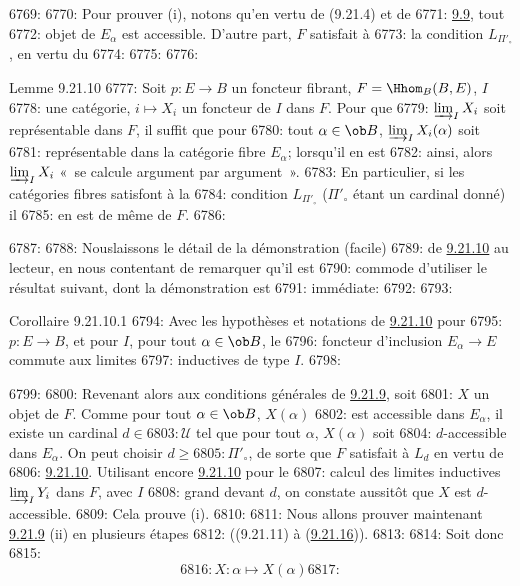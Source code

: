 6769: 
6770: Pour prouver (i), notons qu'en vertu de (9.21.4) et de
6771: \hyperref[I.cor9.9]{9.9}, tout
6772: objet de $E_{\alpha}$ est accessible. D'autre part, $F$ satisfait à
6773: la condition $L_{\Pi'_\circ}$, en vertu du
6774: 
6775: 
6776: \begin{enonce*}{Lemme 9.21.10}
6777: Soit $p:E\rightarrow B$ un foncteur fibrant, $F=\Hhom_B(B,E)$, $I$
6778: une catégorie, $i\mapsto X_i$ un foncteur de $I$ dans $F$. Pour que
6779: $\varinjlim_I X_i$ soit représentable dans $F$, il suffit que pour
6780: tout $\alpha\in \ob B$, $\varinjlim_I X_i(\alpha)$ soit
6781: représentable dans la catégorie fibre $E_{\alpha}$; lorsqu'il en est
6782: ainsi, alors $\varinjlim_I X_i$ « se calcule argument par argument ».
6783: En particulier, si les catégories fibres satisfont à la
6784: condition $L_{\Pi'_\circ}$ ($\Pi'_\circ$ étant un cardinal donné) il
6785: en est de même de $F$.
6786: \end{enonce*}
6787: 
6788: Nous\pageoriginale laissons le détail de la démonstration (facile)
6789: de \hyperref[I.lem9.21.10]{9.21.10} au lecteur, en nous contentant de remarquer qu'il est
6790: commode d'utiliser le résultat suivant, dont la démonstration est
6791: immédiate:
6792: 
6793: \begin{enonce*}{Corollaire 9.21.10.1}
6794: Avec les hypothèses et notations de \hyperref[I.lem9.21.10]{9.21.10} pour
6795: $p:E\rightarrow B$, et pour $I$, pour tout $\alpha\in \ob B$, le
6796: foncteur d'inclusion $E_{\alpha}\rightarrow E$ commute aux limites
6797: inductives de type $I$.
6798: \end{enonce*}
6799: 
6800: Revenant alors aux conditions générales de \hyperref[I.lem9.21.9]{9.21.9}, soit
6801: $X$ un objet de $F$. Comme pour tout $\alpha \in \ob B$, $X(\alpha)$
6802: est accessible dans $E_{\alpha}$, il existe un cardinal $d\in
6803: 𝒰$ tel que pour tout $\alpha$, $X(\alpha)$ soit
6804: $d$-accessible dans $E_{\alpha}$. On peut choisir $d\geq
6805: \Pi'_{\circ}$, de sorte que $F$ satisfait à $L_d$ en vertu de
6806: \hyperref[I.lem9.21.10]{9.21.10}. Utilisant encore \hyperref[I.lem9.21.10]{9.21.10} pour le
6807: calcul des limites inductives $\varinjlim_I Y_i$ dans $F$, avec $I$
6808: grand devant $d$, on constate aussitôt que $X$ est $d$-accessible.
6809: Cela prouve (i).
6810: 
6811: Nous allons prouver maintenant \hyperref[I.lem9.21.9]{9.21.9} (ii) en plusieurs étapes
6812: ((9.21.11) à (\hyperref[I.lem9.21.16]{9.21.16})).
6813: 
6814: Soit donc
6815: $$
6816: X:\alpha\longmapsto X(\alpha)
6817: $$
